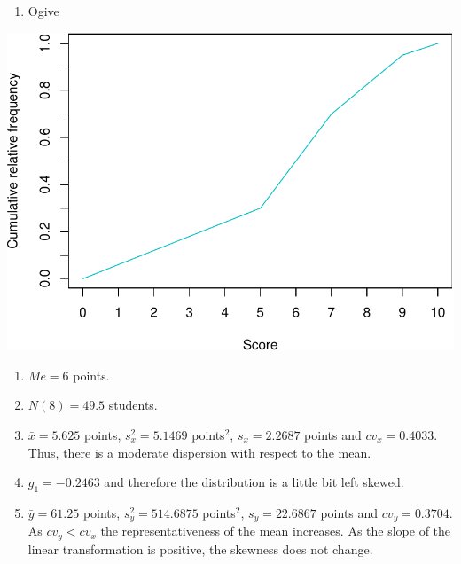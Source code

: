 \documentclass[
  a4paper,
]{scrreport}
\providecommand{\tightlist}{%
  \setlength{\itemsep}{0pt}\setlength{\parskip}{0pt}}\usepackage{longtable,booktabs,array}
\theoremstyle{definition}
\theoremstyle{remark}
\begin{document}
\begin{tcolorbox}[enhanced jigsaw, left=2mm, leftrule=.75mm, opacitybacktitle=0.6, colframe=quarto-callout-tip-color-frame, title=\textcolor{quarto-callout-tip-color}{\faLightbulb}\hspace{0.5em}{Tip}, opacityback=0, breakable, bottomtitle=1mm, titlerule=0mm, colback=white, toptitle=1mm, coltitle=black, bottomrule=.15mm, toprule=.15mm, arc=.35mm, rightrule=.15mm, colbacktitle=quarto-callout-tip-color!10!white]

\begin{enumerate}
\def\labelenumi{\alph{enumi}.}
\tightlist
\item
  Ogive
\end{enumerate}

\includegraphics{./img/exam-2023-03-23/ogive-scores-1.pdf}

\begin{enumerate}
\def\labelenumi{\alph{enumi}.}
\setcounter{enumi}{1}
\item
  \(Me = 6\) points.
\item
  \(N(8) = 49.5\) students.
\item
  \(\bar x = 5.625\) points, \(s_x^2=5.1469\) points\(^2\),
  \(s_x=2.2687\) points and \(cv_x=0.4033\). Thus, there is a moderate
  dispersion with respect to the mean.
\item
  \(g_1 = -0.2463\) and therefore the distribution is a little bit left
  skewed.
\item
  \(\bar y = 61.25\) points, \(s_y^2=514.6875\) points\(^2\),
  \(s_y=22.6867\) points and \(cv_y=0.3704\). As \(cv_y < cv_x\) the
  representativeness of the mean increases. As the slope of the linear
  transformation is positive, the skewness does not change.
\end{enumerate}

\end{tcolorbox}
\end{document}
